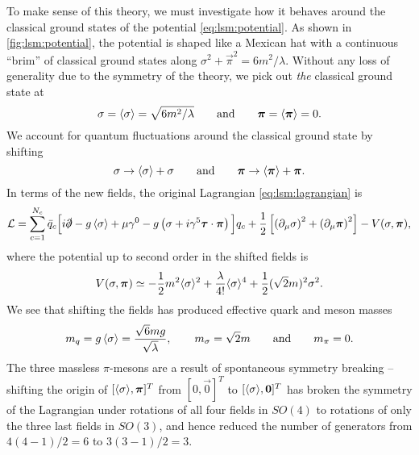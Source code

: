 To make sense of this theory, we must investigate how it behaves around the classical ground states of the potential \eqref{eq:lsm:potential}.
As shown in \cref{fig:lsm:potential}, the potential is shaped like a Mexican hat with a continuous ``brim'' of classical ground states along $\sigma^2 + \vec\pi^2 = 6 m^2 / \lambda$.
Without any loss of generality due to the symmetry of the theory, we pick out \emph{the} classical ground state at
\begin{equation}
	\sigma = \left\langle \sigma \right\rangle = \sqrt{6 m^2 / \lambda}
	\qquad \text{and} \qquad
	{\bm{\pi}} = \left\langle {\bm{\pi}} \right\rangle = 0 .
\end{equation}
We account for quantum fluctuations around the classical ground state by shifting
\begin{equation}
	\sigma \rightarrow \left\langle \sigma \right\rangle + \sigma
	\qquad \text{and} \qquad
	{\bm{\pi}} \rightarrow \left\langle {\bm{\pi}} \right\rangle + {\bm{\pi}}.
\end{equation}
In terms of the new fields, the original Lagrangian \eqref{eq:lsm:lagrangian} is
\begin{equation}
	\mathcal{L} = \sum_{c=1}^{N_c} \bar{q}_c \Big[ i \slashed\partial - g \left\langle \sigma \right\rangle + \mu \gamma^0 - g \left( \sigma + i \gamma^5 {\bm{\tau}} \cdot {\bm{\pi}} \right) \Big] q_c
	      + \frac12 \left[ \left( \partial_\mu \sigma \right)^2 + \left( \partial_\mu {\bm{\pi}} \right)^2 \right] - V(\sigma,{\bm{\pi}}) ,
\end{equation}
where the potential up to second order in the shifted fields is
\begin{equation}
	V(\sigma, {\bm{\pi}}) \simeq -\frac12 m^2 \langle \sigma \rangle^2 + \frac{\lambda}{4!} \langle \sigma \rangle^4 + \frac12 (\sqrt{2} m)^2 \sigma^2 .
\label{eq:lsm:potential_shifted}
\end{equation}
We see that shifting the fields has produced effective quark and meson masses
\begin{equation}
	m_q = g \left\langle \sigma \right\rangle = \frac{\sqrt{6} m g}{\sqrt{\lambda}}
	, \qquad
	m_\sigma = \sqrt{2} m
	\qquad \text{and} \qquad
	m_\pi = 0.
\end{equation}
The three massless $\pi$-mesons are a result of spontaneous symmetry breaking --
shifting the origin of $[\langle \sigma \rangle, {\bm{\pi}}]^T$ from $[0, \vec{0}]^T$ to $[\langle \sigma \rangle, {\bm{0}}]^T$ has broken the symmetry of the Lagrangian under rotations of all four fields in $SO(4)$ to rotations of only the three last fields in $SO(3)$, and hence reduced the number of generators from $4(4-1)/2=6$ to $3(3-1)/2=3$.
